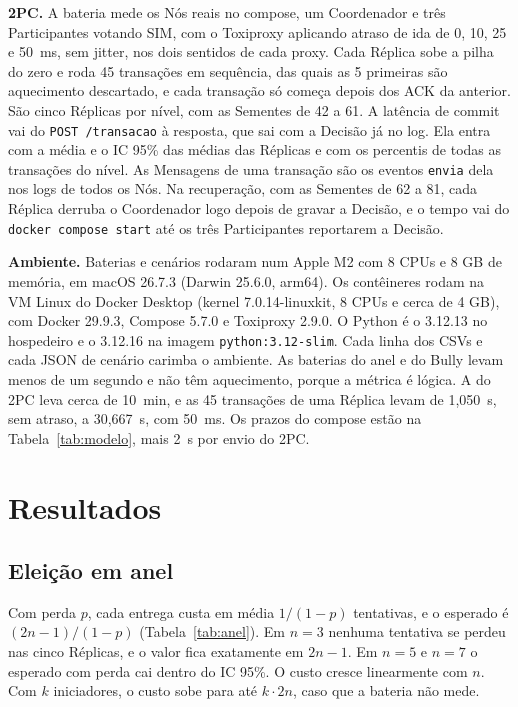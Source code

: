 \documentclass[conference]{IEEEtran}
\newcommand{\cod}[1]{\texttt{\upshape #1}}
\begin{document}
\textbf{2PC.} A bateria mede os Nós reais no compose, um Coordenador e três Participantes votando
SIM, com o Toxiproxy aplicando atraso de ida de 0, 10, 25 e 50~ms, sem jitter, nos dois sentidos de
cada proxy. Cada Réplica sobe a pilha do zero e roda 45 transações em sequência, das quais as 5
primeiras são aquecimento descartado, e cada transação só começa depois dos ACK da anterior. São
cinco Réplicas por nível, com as Sementes de 42 a 61. A latência de commit vai do
\cod{POST /transacao} à resposta, que sai com a Decisão já no log. Ela entra com a média e o IC 95\%
das médias das Réplicas e com os percentis de todas as transações do nível. As Mensagens de uma
transação são os eventos \cod{envia} dela nos logs de todos os Nós. Na recuperação, com as Sementes
de 62 a 81, cada Réplica derruba o Coordenador logo depois de gravar a Decisão, e o tempo vai do
\cod{docker compose start} até os três Participantes reportarem a Decisão.

\textbf{Ambiente.} Baterias e cenários rodaram num Apple M2 com 8 CPUs e 8 GB de memória, em macOS
26.7.3 (Darwin 25.6.0, arm64). Os contêineres rodam na VM Linux do Docker Desktop (kernel
7.0.14-linuxkit, 8 CPUs e cerca de 4 GB), com Docker 29.9.3, Compose 5.7.0 e Toxiproxy 2.9.0. O
Python é o 3.12.13 no hospedeiro e o 3.12.16 na imagem \cod{python:3.12-slim}. Cada linha dos CSVs e cada JSON de cenário carimba o ambiente. As
baterias do anel e do Bully levam menos de um segundo e não têm aquecimento, porque a métrica é
lógica. A do 2PC leva cerca de 10~min, e as 45 transações de uma Réplica levam de 1,050~s, sem
atraso, a 30,667~s, com 50~ms. Os prazos do compose estão na Tabela~\ref{tab:modelo}, mais 2~s por
envio do 2PC.

\section{Resultados}
\label{sec:resultados}

\subsection{Eleição em anel}
Com perda $p$, cada entrega custa em média $1/(1-p)$ tentativas, e o esperado é $(2n-1)/(1-p)$
(Tabela~\ref{tab:anel}). Em $n=3$ nenhuma tentativa se perdeu nas cinco Réplicas, e o valor fica
exatamente em $2n-1$. Em $n=5$ e $n=7$ o esperado com perda cai dentro do IC 95\%. O custo cresce
linearmente com $n$. Com $k$ iniciadores, o custo sobe para até $k\cdot 2n$, caso que a bateria
não mede.
\end{document}
